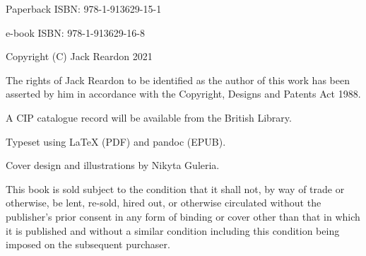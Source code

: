 Paperback ISBN: 978-1-913629-15-1

e-book ISBN: 978-1-913629-16-8

Copyright (C) Jack Reardon 2021

The rights of Jack Reardon to be identified as the author of this work
has been asserted by him in accordance with the Copyright, Designs and
Patents Act 1988.

A CIP catalogue record will be available from the British Library.

Typeset using LaTeX (PDF) and pandoc (EPUB).

Cover design and illustrations by Nikyta Guleria.

This book is sold subject to the condition that it shall not, by way of
trade or otherwise, be lent, re-sold, hired out, or otherwise circulated
without the publisher's prior consent in any form of binding or cover
other than that in which it is published and without a similar condition
including this condition being imposed on the subsequent purchaser.
